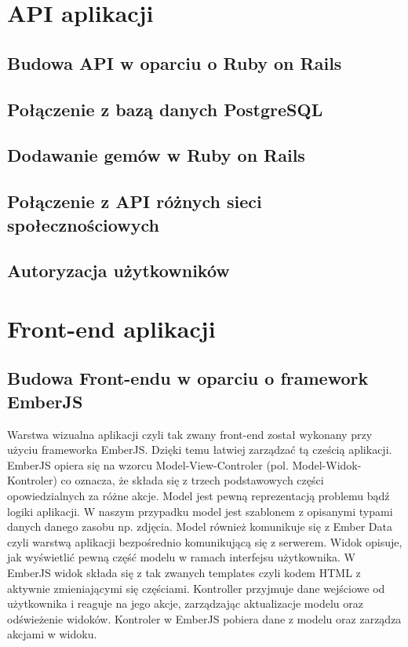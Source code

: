 \documentclass[brudnopis]{xmgr}
\begin{document}
\section{API aplikacji}
\subsection{Budowa API w oparciu o Ruby on Rails}
\subsection{Połączenie z bazą danych PostgreSQL}
\subsection{Dodawanie gemów w Ruby on Rails}
\subsection{Połączenie z API różnych sieci społecznościowych}
\subsection{Autoryzacja użytkowników}

\section{Front-end aplikacji}

\subsection{Budowa Front-endu w oparciu o framework EmberJS }
Warstwa wizualna aplikacji czyli tak zwany front-end został wykonany przy użyciu frameworka EmberJS. Dzięki temu łatwiej zarządzać tą cześcią aplikacji. EmberJS opiera się na wzorcu Model-View-Controler (pol. Model-Widok-Kontroler) co oznacza, że składa się z
trzech podstawowych części opowiedzialnych za różne akcje. Model  jest pewną reprezentacją problemu bądź logiki aplikacji. W naszym przypadku model jest szablonem z opisanymi typami danych danego zasobu np. zdjęcia. Model również komunikuje się z Ember Data czyli warstwą aplikacji bezpośrednio komunikującą się z serwerem.  Widok opisuje, jak wyświetlić pewną część modelu w ramach interfejsu użytkownika. W EmberJS widok składa się z tak zwanych templates czyli kodem HTML z aktywnie zmieniającymi się częściami. Kontroller przyjmuje dane wejściowe od użytkownika i reaguje na jego akcje, zarządzając aktualizacje modelu oraz odświeżenie widoków. Kontroler w EmberJS pobiera dane z modelu oraz zarządza akcjami w widoku.
\end{document}
